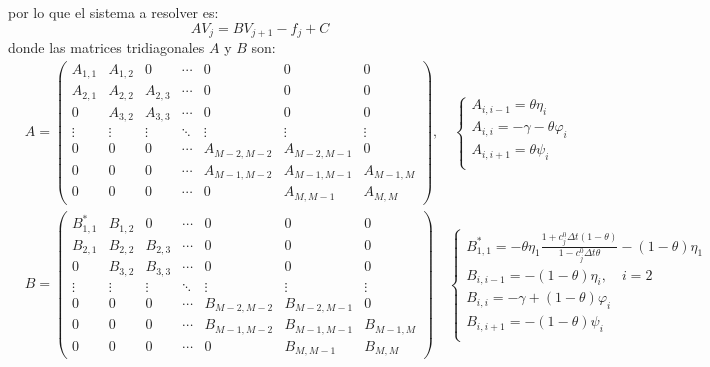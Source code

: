 por lo que el sistema a resolver es:
\begin{equation*}
    \boxed{A V_j = B V_{j+1} - f_j + C}
\end{equation*}
donde las matrices tridiagonales $A$ y $B$ son:
\begin{align*}
    &\boxed{
        A = \begin{pmatrix}
            A_{1,1} & A_{1,2} & 0 & \cdots & 0 & 0 & 0 \\
            A_{2,1} & A_{2,2} & A_{2,3} & \cdots & 0 & 0 & 0 \\
            0 & A_{3,2} & A_{3,3} & \cdots & 0 & 0 & 0 \\
            \vdots & \vdots & \vdots & \ddots & \vdots & \vdots & \vdots \\
            0 & 0 & 0 & \cdots & A_{M-2,M-2} & A_{M-2,M-1} & 0 \\
            0 & 0 & 0 & \cdots & A_{M-1,M-2} & A_{M-1,M-1} & A_{M-1,M} \\
            0 & 0 & 0 & \cdots & 0  & A_{M,M-1} & A_{M,M}
        \end{pmatrix},
        \quad \begin{cases}
            A_{i,i-1} = \theta\eta_i \\
            A_{i,i} = -\gamma - \theta \varphi_i \\
            A_{i,i+1} = \theta\psi_i \\
        \end{cases}
    } \\
    & \boxed{
        B = \begin{pmatrix}
            B_{1,1}^* & B_{1,2} & 0 & \cdots & 0 & 0 & 0 \\
            B_{2,1} & B_{2,2} & B_{2,3} & \cdots & 0 & 0 & 0 \\
            0 & B_{3,2} & B_{3,3} & \cdots & 0 & 0 & 0 \\
            \vdots & \vdots & \vdots & \ddots & \vdots & \vdots & \vdots \\
            0 & 0 & 0 & \cdots & B_{M-2,M-2} & B_{M-2,M-1} & 0 \\
            0 & 0 & 0 & \cdots & B_{M-1,M-2} & B_{M-1,M-1} & B_{M-1,M} \\
            0 & 0 & 0 & \cdots & 0  & B_{M,M-1} & B_{M,M}
        \end{pmatrix}
        \quad \begin{cases}
            B_{1,1}^* = -\theta\eta_1 \frac{1 + c_j^0 \Delta t (1-\theta)}{1 - c_j^0 \Delta t \theta} - (1-\theta)\eta_1 \\
            B_{i,i-1} = -(1-\theta)\eta_i, \quad i=2 \\
            B_{i,i} = -\gamma + (1-\theta) \varphi_i \\
            B_{i,i+1} = -(1-\theta)\psi_i \\
        \end{cases}
    }
\end{align*}
